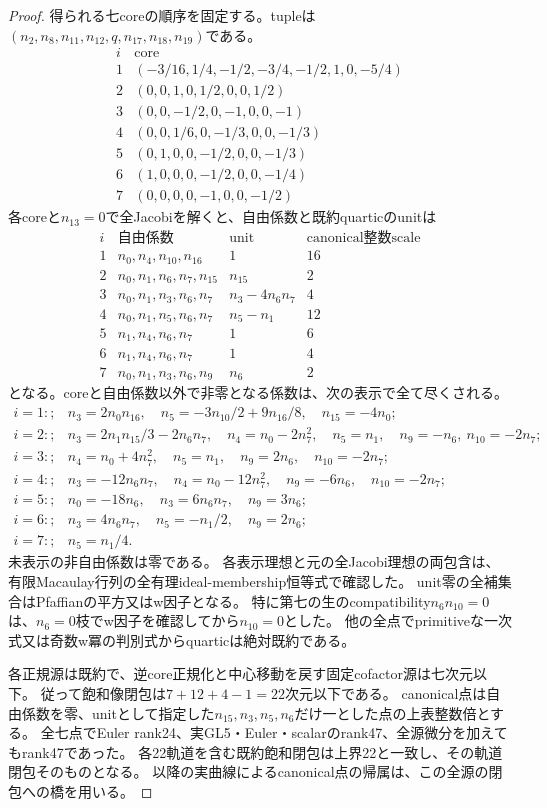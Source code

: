 \documentclass[a4paper,11pt]{ltjsarticle}
\theoremstyle{definition}
\begin{document}
\begin{proof}
得られる七coreの順序を固定する。tupleは$(n_2,n_8,n_{11},n_{12},q,n_{17},n_{18},n_{19})$である。
\[
\begin{array}{c|c}
 i&\text{core}\\\hline
 1&(-3/16,1/4,-1/2,-3/4,-1/2,1,0,-5/4)\\
 2&(0,0,1,0,1/2,0,0,1/2)\\
 3&(0,0,-1/2,0,-1,0,0,-1)\\
 4&(0,0,1/6,0,-1/3,0,0,-1/3)\\
 5&(0,1,0,0,-1/2,0,0,-1/3)\\
 6&(1,0,0,0,-1/2,0,0,-1/4)\\
 7&(0,0,0,0,-1,0,0,-1/2)
\end{array}
\]
各coreと$n_{13}=0$で全Jacobiを解くと、自由係数と既約quarticのunitは
\[
\begin{array}{c|c|c|c}
 i&\text{自由係数}&\text{unit}&\text{canonical整数scale}\\\hline
 1&n_0,n_4,n_{10},n_{16}&1&16\\
 2&n_0,n_1,n_6,n_7,n_{15}&n_{15}&2\\
 3&n_0,n_1,n_3,n_6,n_7&n_3-4n_6n_7&4\\
 4&n_0,n_1,n_5,n_6,n_7&n_5-n_1&12\\
 5&n_1,n_4,n_6,n_7&1&6\\
 6&n_1,n_4,n_6,n_7&1&4\\
 7&n_0,n_1,n_3,n_6,n_9&n_6&2
\end{array}
\]
となる。coreと自由係数以外で非零となる係数は、次の表示で全て尽くされる。
\[
\begin{aligned}
 i=1:;&n_3=2n_0n_{16},\quad n_5=-3n_{10}/2+9n_{16}/8,\quad n_{15}=-4n_0;\\
 i=2:;&n_3=2n_1n_{15}/3-2n_6n_7,\quad n_4=n_0-2n_7^2,\quad n_5=n_1,\quad n_9=-n_6,\ n_{10}=-2n_7;\\
 i=3:;&n_4=n_0+4n_7^2,\quad n_5=n_1,\quad n_9=2n_6,\quad n_{10}=-2n_7;\\
 i=4:;&n_3=-12n_6n_7,\quad n_4=n_0-12n_7^2,\quad n_9=-6n_6,\quad n_{10}=-2n_7;\\
 i=5:;&n_0=-18n_6,\quad n_3=6n_6n_7,\quad n_9=3n_6;\\
 i=6:;&n_3=4n_6n_7,\quad n_5=-n_1/2,\quad n_9=2n_6;\\
 i=7:;&n_5=n_1/4.
\end{aligned}
\]
未表示の非自由係数は零である。
各表示理想と元の全Jacobi理想の両包含は、有限Macaulay行列の全有理ideal-membership恒等式で確認した。
unit零の全補集合はPfaffianの平方又はw因子となる。
特に第七の生のcompatibility$n_6n_{10}=0$は、$n_6=0$枝でw因子を確認してから$n_{10}=0$とした。
他の全点でprimitiveな一次式又は奇数w冪の判別式からquarticは絶対既約である。

各正規源は既約で、逆core正規化と中心移動を戻す固定cofactor源は七次元以下。
従って飽和像閉包は$7+12+4-1=22$次元以下である。
canonical点は自由係数を零、unitとして指定した$n_{15},n_3,n_5,n_6$だけ一とした点の上表整数倍とする。
全七点でEuler rank24、実GL5・Euler・scalarのrank47、全源微分を加えてもrank47であった。
各22軌道を含む既約飽和閉包は上界22と一致し、その軌道閉包そのものとなる。
以降の実曲線によるcanonical点の帰属は、この全源の閉包への橋を用いる。
\end{proof}
\end{document}
